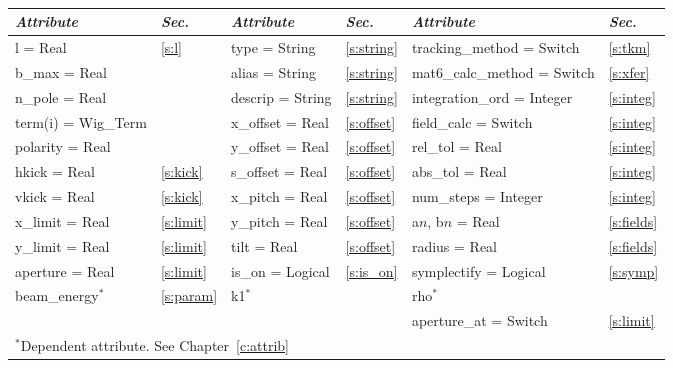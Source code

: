 {{\begin{center}
\tt
\begin{tabular}{|l|l||l|l||l|l|} \hline
  {\sl Attribute} & {\sl Sec.}  & {\sl Attribute} & {\sl Sec.} & {\sl Attribute} & {\sl Sec.} \\ \hline
  l        = Real       & \ref{s:l}      & type = String      & \ref{s:string} & tracking\_method = Switch   & \ref{s:tkm}   \\ \hline
  b\_max   = Real       &                & alias = String     & \ref{s:string} & mat6\_calc\_method = Switch & \ref{s:xfer}  \\ \hline
  n\_pole  = Real       &                & descrip = String   & \ref{s:string} & integration\_ord = Integer  & \ref{s:integ} \\ \hline
  term(i) = Wig\_Term   &                & x\_offset  = Real  & \ref{s:offset} & field\_calc = Switch        & \ref{s:integ} \\ \hline
  polarity = Real       &                & y\_offset  = Real  & \ref{s:offset} & rel\_tol = Real             & \ref{s:integ} \\ \hline
  hkick    = Real       & \ref{s:kick}   & s\_offset  = Real  & \ref{s:offset} & abs\_tol = Real             & \ref{s:integ} \\ \hline
  vkick    = Real       & \ref{s:kick}   & x\_pitch = Real    & \ref{s:offset} & num\_steps = Integer        & \ref{s:integ} \\ \hline
  x\_limit = Real       & \ref{s:limit}  & y\_pitch = Real    & \ref{s:offset} & a$n$, b$n$ = Real           & \ref{s:fields}\\ \hline
  y\_limit = Real       & \ref{s:limit}  & tilt     = Real    & \ref{s:offset} & radius  = Real              & \ref{s:fields}\\ \hline
  aperture = Real       & \ref{s:limit}  & is\_on = Logical   & \ref{s:is_on}  & symplectify = Logical       & \ref{s:symp}  \\ \hline
  beam\_energy$^*$      & \ref{s:param}  & k1$^*$             &                & rho$^*$                     &               \\ \hline
                        &                &                    &                & aperture\_at = Switch       & \ref{s:limit} \\ \hline
  \multicolumn{6}{l}{\small $^*$Dependent attribute. See Chapter~\ref{c:attrib}} \\
\end{tabular}
\end{center}
\toffset

}}
